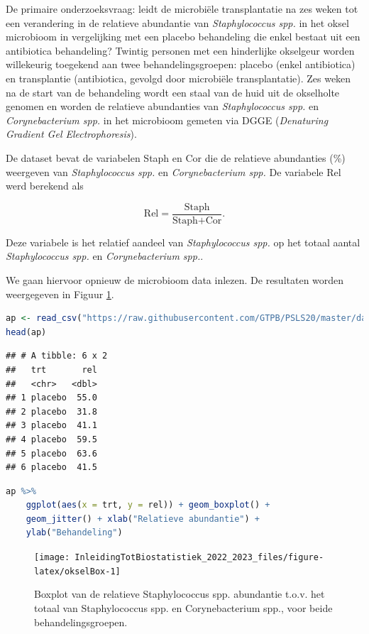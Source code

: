 \documentclass[
  12pt,dutch,coursenotes]{book}
\begin{document}
De primaire onderzoeksvraag: leidt de microbiële transplantatie na zes weken tot een verandering in de relatieve abundantie van \emph{Staphylococcus spp.} in het oksel microbioom in vergelijking met een placebo behandeling die enkel bestaat uit een antibiotica behandeling?
Twintig personen met een hinderlijke okselgeur worden willekeurig toegekend aan twee behandelingsgroepen: placebo (enkel antibiotica) en transplantie (antibiotica, gevolgd door microbiële transplantatie).
Zes weken na de start van de behandeling wordt een staal van de huid uit de okselholte genomen en worden de relatieve abundanties van \emph{Staphylococcus spp.} en \emph{Corynebacterium spp.} in het microbioom gemeten via DGGE (\emph{Denaturing Gradient Gel Electrophoresis}).

De dataset bevat de variabelen Staph en Cor die de relatieve abundanties (\%) weergeven van \emph{Staphylococcus spp.} en \emph{Corynebacterium spp.} De variabele Rel werd berekend als

\[
    \text{Rel}=\frac{\text{Staph}}{\text{Staph}+\text{Cor}}.
  \]

Deze variabele is het relatief aandeel van \emph{Staphylococcus spp.} op het totaal aantal \emph{Staphylococcus spp.} en \emph{Corynebacterium spp.}.

We gaan hiervoor opnieuw de microbioom data inlezen.
De resultaten worden weergegeven in Figuur \ref{fig:okselBox}.

\begin{lstlisting}[language=R]
ap <- read_csv("https://raw.githubusercontent.com/GTPB/PSLS20/master/data/armpit.csv")
head(ap)
\end{lstlisting}

\begin{lstlisting}
## # A tibble: 6 x 2
##   trt       rel
##   <chr>   <dbl>
## 1 placebo  55.0
## 2 placebo  31.8
## 3 placebo  41.1
## 4 placebo  59.5
## 5 placebo  63.6
## 6 placebo  41.5
\end{lstlisting}

\begin{lstlisting}[language=R]
ap %>%
    ggplot(aes(x = trt, y = rel)) + geom_boxplot() +
    geom_jitter() + xlab("Relatieve abundantie") +
    ylab("Behandeling")
\end{lstlisting}

\begin{figure}

{\centering \texttt{[image: InleidingTotBiostatistiek\_2022\_2023\_files/figure-latex/okselBox-1]} 

}

\caption{Boxplot van de relatieve Staphylococcus spp. abundantie t.o.v. het totaal van Staphylococcus spp. en Corynebacterium spp., voor beide behandelingsgroepen.}\label{fig:okselBox}
\end{figure}
\end{document}
